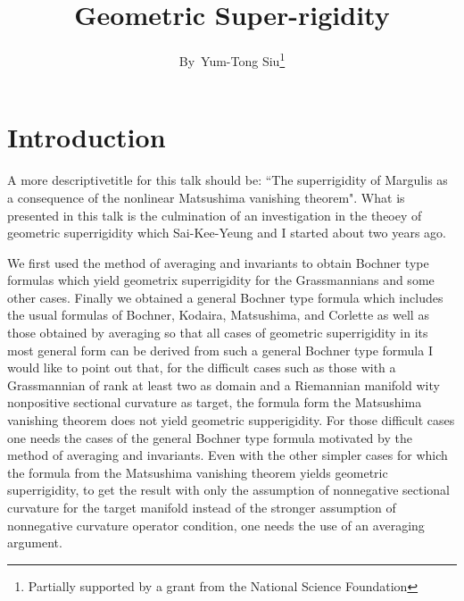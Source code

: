 \title{Geometric Super-rigidity}

\author{By~Yum-Tong Siu\footnote{Partially supported by a grant from the National Science Foundation}}


\date{}
\maketitle

\section*{Introduction}

A more descriptive\pageoriginale title for this talk should be: ``The superrigidity of Margulis as a consequence of the nonlinear Matsushima vanishing theorem". What is presented in this talk is the culmination of an investigation in the theoey of geometric superrigidity which Sai-Kee-Yeung and I started about two years ago.

We first used the method of averaging and invariants to obtain Boch\-ner type formulas which yield geometrix superrigidity for the Grassmannians and some other cases. Finally we obtained a general Bochner type formula which includes the usual formulas of Bochner, Kodaira, Matsushima, and Corlette as well as those obtained by averaging so that all cases of geometric superrigidity in its most general form can be derived from such a general Bochner type formula I would like to point out that, for the difficult cases such as those with a Grassmannian of rank at least two as domain and a Riemannian manifold wity nonpositive sectional curvature as target, the formula form the Matsushima vanishing theorem does not yield geometric supperigidity. For those difficult cases one needs the cases of the general Bochner type formula motivated by the method of averaging and invariants. Even with the other simpler cases for which the formula from the Matsushima vanishing theorem yields geometric superrigidity, to get the result with only the assumption of nonnegative sectional curvature for the target manifold instead of the stronger assumption of nonnegative curvature operator condition, one needs the use of an averaging argument.

